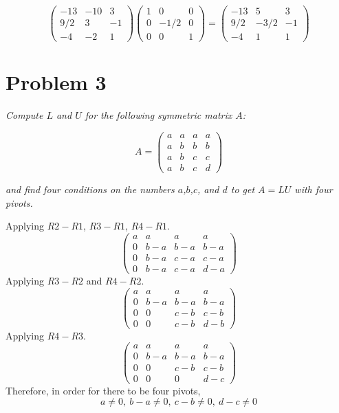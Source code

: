 \documentclass{article}
\begin{document}
\[
    \begin{pmatrix}
        -13 & -10 & 3 \\
        9/2 & 3 & -1 \\
        -4 & -2 & 1
    \end{pmatrix}
    \begin{pmatrix}
        1 & 0 & 0 \\
        0 & -1/2 & 0 \\
        0 & 0 & 1
    \end{pmatrix}
    =
    \begin{pmatrix}
        -13 & 5 & 3 \\
        9/2 & -3/2 & -1 \\
        -4 & 1 & 1
    \end{pmatrix}
\]

\section*{Problem 3}

\textit{Compute $L$ and $U$ for the following symmetric matrix $A$:}

\[
    A = \begin{pmatrix}
        a & a & a & a \\
        a & b & b & b \\
        a & b & c & c \\
        a & b & c & d
    \end{pmatrix}
\]

\textit{and find four conditions on the numbers $a$,$b$,$c$, and $d$ to get
$A=LU$ with four pivots.}

\bigbreak

Applying $ R2 - R1 $, $R3 - R1 $, $ R4 - R1 $.
\[
    \begin{pmatrix}
        a & a & a & a \\
        0 & b - a & b - a & b - a \\
        0 & b - a & c - a & c - a \\
        0 & b - a & c - a & d - a
    \end{pmatrix}
\]
Applying $ R3 - R2 $ and $ R4 - R2 $.
\[
    \begin{pmatrix}
        a & a & a & a \\
        0 & b - a & b - a & b - a \\
        0 & 0 & c - b & c - b \\
        0 & 0 & c - b & d - b
    \end{pmatrix}
\]
Applying $ R4 - R3 $.
\[
    \begin{pmatrix}
        a & a & a & a \\
        0 & b - a & b - a & b - a \\
        0 & 0 & c - b & c - b \\
        0 & 0 & 0 & d - c
    \end{pmatrix}
\]
Therefore, in order for there to be four pivots,
$$ a \neq 0,\ b - a \neq 0,\ c - b \neq 0,\ d - c \neq 0 $$
\end{document}
